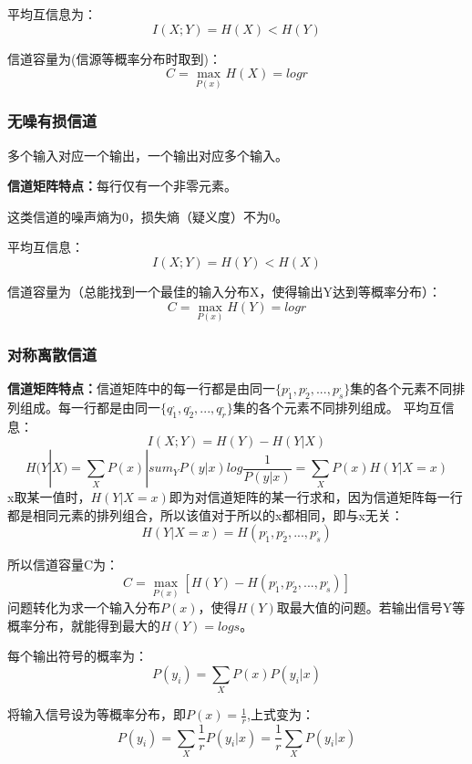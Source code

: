 \documentclass[UTF8]{ctexart} %
\begin{document}
			平均互信息为：
			\[I(X;Y) = H(X)<H(Y)\]
			
			信道容量为(信源等概率分布时取到)：
			\[C = \max_{P(x)}H(X) = logr\]
		\subsubsection{无噪有损信道}
			多个输入对应一个输出，一个输出对应多个输入。
			\begin{figure}[H]
			\end{figure}
			\textbf{信道矩阵特点：}每行仅有一个非零元素。
			
			这类信道的噪声熵为0，损失熵（疑义度）不为0。
			
			平均互信息：
			\[I(X;Y) = H(Y)<H(X)\]
			
			信道容量为（总能找到一个最佳的输入分布X，使得输出Y达到等概率分布）：
			\[C = \max_{P(x)}H(Y) = logr\]
		\subsubsection{对称离散信道}
			\textbf{信道矩阵特点：}信道矩阵中的每一行都是由同一$\{p_1^,,p_2^,,...,p_s^,\}$集的各个元素不同排列组成。每一行都是由同一$\{q_1^,,q_2^,,...,q_r^,\}$集的各个元素不同排列组成。
			平均互信息：
			\[I(X;Y) = H(Y)-H(Y|X)\]
			\[H(Y|X) = \sum_XP(x)|sum_YP(y|x)log\frac{1}{P(y|x)} = \sum_XP(x)H(Y|X=x)\]
			x取某一值时，$H(Y|X=x)$即为对信道矩阵的某一行求和，因为信道矩阵每一行都是相同元素的排列组合，所以该值对于所以的x都相同，即与x无关：
			\[H(Y|X=x) = H(p_1^,,p_2^,,...,p_s^,)\]
			
			所以信道容量C为：
			\[C = \max_{P(x)}[H(Y) -  H(p_1^,,p_2^,,...,p_s^,)]\]
			问题转化为求一个输入分布$P(x)$，使得$H(Y)$取最大值的问题。若输出信号Y等概率分布，就能得到最大的$H(Y)=logs$。
			
			每个输出符号的概率为：
			\[P(y_i) = \sum_{X}P(x)P(y_i|x)\]
			
			将输入信号设为等概率分布，即$P(x)=\frac{1}{r}$,上式变为：
			\[P(y_i) = \sum_{X}\frac{1}{r}P(y_i|x) = \frac{1}{r}\sum_{X}P(y_i|x)\]
			
\end{document}
